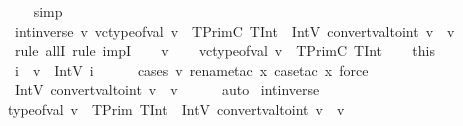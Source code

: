\begin{isabellebody}
%
\isadelimproof
\ \ %
\endisadelimproof
%
\isatagproof
{}\isamarkupfalse%
\ simp%
\endisatagproof
{\isafoldproof}%
%
\isadelimproof
\isanewline
%
\endisadelimproof
\isanewline
{}\isamarkupfalse%
\ int{\isacharunderscore}{\kern0pt}inverse{\isacharunderscore}{\kern0pt}{}{\isacharcolon}{\kern0pt}{\isachardoublequoteopen}{\isasymforall}\ v{\isachardot}{\kern0pt}\ vc{\isacharunderscore}{\kern0pt}type{\isacharunderscore}{\kern0pt}of{\isacharunderscore}{\kern0pt}val\ v\ {\isacharequal}{\kern0pt}\ TPrimC\ TInt\ {\isasymlongrightarrow}\ IntV\ {\isacharparenleft}{\kern0pt}convert{\isacharunderscore}{\kern0pt}val{\isacharunderscore}{\kern0pt}to{\isacharunderscore}{\kern0pt}int\ v{\isacharparenright}{\kern0pt}\ {\isacharequal}{\kern0pt}\ v{\isachardoublequoteclose}\isanewline
%
\isadelimproof
%
\endisadelimproof
%
\isatagproof
{}\isamarkupfalse%
\ {\isacharparenleft}{\kern0pt}rule\ allI{\isacharcomma}{\kern0pt}\ rule\ impI{\isacharparenright}{\kern0pt}\isanewline
\ \ \isamarkupfalse%
\ v\isanewline
\ \ \isamarkupfalse%
\ {\isachardoublequoteopen}vc{\isacharunderscore}{\kern0pt}type{\isacharunderscore}{\kern0pt}of{\isacharunderscore}{\kern0pt}val\ v\ {\isacharequal}{\kern0pt}\ TPrimC\ TInt{\isachardoublequoteclose}\isanewline
\ \ \isamarkupfalse%
\ this\ \isamarkupfalse%
\ i\ \ {\isachardoublequoteopen}v\ {\isacharequal}{\kern0pt}\ IntV\ i{\isachardoublequoteclose}\isanewline
\ \ \ \ \isamarkupfalse%
\ {\isacharparenleft}{\kern0pt}cases\ v{\isacharcomma}{\kern0pt}\ rename{\isacharunderscore}{\kern0pt}tac\ x{\isacharcomma}{\kern0pt}\ case{\isacharunderscore}{\kern0pt}tac\ x{\isacharsemicolon}{\kern0pt}\ force{\isacharparenright}{\kern0pt}\isanewline
\ \ \isamarkupfalse%
\ {\isachardoublequoteopen}IntV\ {\isacharparenleft}{\kern0pt}convert{\isacharunderscore}{\kern0pt}val{\isacharunderscore}{\kern0pt}to{\isacharunderscore}{\kern0pt}int\ v{\isacharparenright}{\kern0pt}\ {\isacharequal}{\kern0pt}\ v{\isachardoublequoteclose}\isanewline
\ \ \ \ \isamarkupfalse%
\ auto\isanewline
{}\isamarkupfalse%
%
\endisatagproof
{\isafoldproof}%
%
\isadelimproof
\isanewline
%
\endisadelimproof
\isanewline
{}\isamarkupfalse%
\ int{\isacharunderscore}{\kern0pt}inverse{\isacharunderscore}{\kern0pt}{}{\isacharcolon}{\kern0pt}\isanewline
{\isachardoublequoteopen}type{\isacharunderscore}{\kern0pt}of{\isacharunderscore}{\kern0pt}val\ v\ {\isacharequal}{\kern0pt}\ TPrim\ TInt\ {\isasymLongrightarrow}\ IntV\ {\isacharparenleft}{\kern0pt}convert{\isacharunderscore}{\kern0pt}val{\isacharunderscore}{\kern0pt}to{\isacharunderscore}{\kern0pt}int\ v{\isacharparenright}{\kern0pt}\ {\isacharequal}{\kern0pt}\ v{\isachardoublequoteclose}\isanewline

\end{isabellebody}
